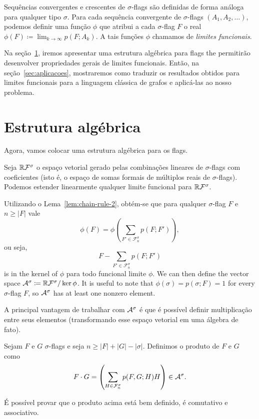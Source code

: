 Sequências convergentes e crescentes de $\sigma$-flags são definidas de forma análoga para qualquer tipo $\sigma$.
Para cada sequência convergente de $\sigma$-flags $(A_1,A_2,\dots)$, podemos definir uma função $\phi$ que atribui a cada $\sigma$-flag $F$ o real $\phi(F) \coloneqq \lim_{k \to \infty} p(F;A_k)$.
A tais funções $\phi$ chamamos de \emph{limites funcionais}.

Na seção~\ref{sec:estrutura-algebrica}, iremos apresentar uma estrutura algébrica para flags the permitirão desenvolver propriedades gerais de limites funcionais.
Então, na seção~\ref{sec:aplicacoes}, mostraremos como traduzir os resultados obtidos para limites funcionais para a linguagem clássica de grafos e aplicá-las ao nosso problema.

\section{Estrutura algébrica}\label{sec:estrutura-algebrica}

Agora, vamos colocar uma estrutura algébrica para os flags.

Seja $\mathbb{R}\mathcal{F}^\sigma$ o espaço vetorial gerado pelas combinações lineares de $\sigma$-flags com coeficientes (isto é, o espaço de somas formais de múltiplos reais de $\sigma$-flags).
Podemos estender linearmente qualquer limite funcional para $\mathbb{R}\mathcal{F}^\sigma$.

Utilizando o Lema~\ref{lem:chain-rule-2}, obtém-se que para qualquer $\sigma$-flag $F$ e $n \geq |F|$ vale
\[ \phi(F) = \phi\left( \sum_{F' \in \mathcal F_n^\sigma} p(F;F') \right), \]
ou seja,
\[ F - \sum_{F' \in \mathcal F_n^\sigma} p(F;F') \]
is in the kernel of $\phi$ para todo funcional limite $\phi$.
We can then define the vector space $\mathcal{A}^\sigma \coloneqq \mathbb{R}\mathcal{F}^\sigma / \ker \phi$.
It is useful to note that $\phi(\sigma) = p(\sigma;F) = 1$ for every $\sigma$-flag $F$, so $\mathcal{A}^\sigma$ has at least one nonzero element.

A principal vantagem de trabalhar com $\mathcal{A}^\sigma$ é que é possível definir multiplicação entre seus elementos (transformando esse espaço vetorial em uma álgebra de fato).

\begin{definition}
  Sejam $F$ e $G$ $\sigma$-flags e seja $n \geq |F|+|G|-|\sigma|$.
  Definimos o produto de $F$ e $G$ como
  \[ F \cdot G = \left( \sum_{H \in \mathcal F_n^\sigma} p(F,G;H)H \right) \in \mathcal{A}^\sigma. \]
\end{definition}

É possível provar que o produto acima está bem definido, é comutativo e associativo.

